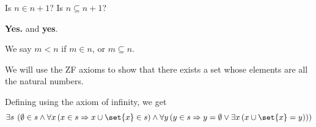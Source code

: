 \documentclass[10pt]{mypackage}
\begin{document}
\begin{question}
  Is $n\in n+1$? Is $n\subseteq n+1$?
\begin{answer}
  \textbf{Yes.} and \textbf{yes}.

\end{answer}
\end{question}
\begin{definition}
  We say $m < n$ if $m\in n$, or $m\subseteq n$.
\end{definition}
\begin{example}
  We will use the ZF axioms to show that there exists a set whose elements are all the natural numbers.\newline

  Defining using the axiom of infinity, we get
  \begin{align*}
    \exists s\:\left(\emptyset \in s \wedge \forall x\left(x\in s \Rightarrow x\cup \set{x}\in s\right)\wedge \forall y\left(y\in s \Rightarrow y = \emptyset \vee \exists x\left(x\cup \set{x} = y\right)\right)\right)
  \end{align*}
\end{example}
\end{document}
